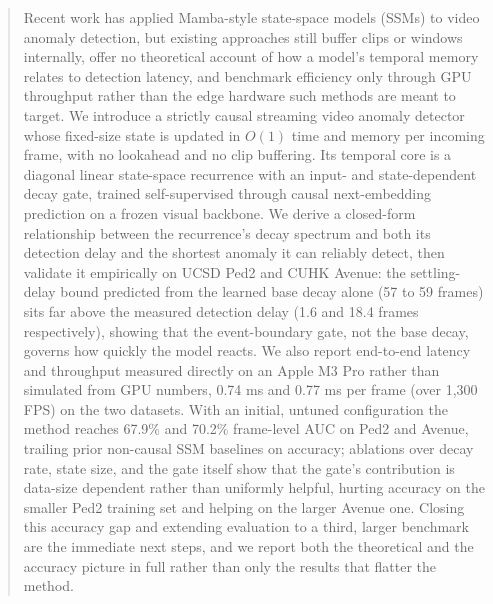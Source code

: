 \begin{abstract}
Recent work has applied Mamba-style state-space models (SSMs) to video anomaly detection, but existing approaches still buffer clips or windows internally, offer no theoretical account of how a model's temporal memory relates to detection latency, and benchmark efficiency only through GPU throughput rather than the edge hardware such methods are meant to target. We introduce a strictly causal streaming video anomaly detector whose fixed-size state is updated in $O(1)$ time and memory per incoming frame, with no lookahead and no clip buffering. Its temporal core is a diagonal linear state-space recurrence with an input- and state-dependent decay gate, trained self-supervised through causal next-embedding prediction on a frozen visual backbone. We derive a closed-form relationship between the recurrence's decay spectrum and both its detection delay and the shortest anomaly it can reliably detect, then validate it empirically on UCSD Ped2 and CUHK Avenue: the settling-delay bound predicted from the learned base decay alone (57 to 59 frames) sits far above the measured detection delay (1.6 and 18.4 frames respectively), showing that the event-boundary gate, not the base decay, governs how quickly the model reacts. We also report end-to-end latency and throughput measured directly on an Apple M3 Pro rather than simulated from GPU numbers, 0.74 ms and 0.77 ms per frame (over 1,300 FPS) on the two datasets. With an initial, untuned configuration the method reaches 67.9\% and 70.2\% frame-level AUC on Ped2 and Avenue, trailing prior non-causal SSM baselines on accuracy; ablations over decay rate, state size, and the gate itself show that the gate's contribution is data-size dependent rather than uniformly helpful, hurting accuracy on the smaller Ped2 training set and helping on the larger Avenue one. Closing this accuracy gap and extending evaluation to a third, larger benchmark are the immediate next steps, and we report both the theoretical and the accuracy picture in full rather than only the results that flatter the method.
\end{abstract}
